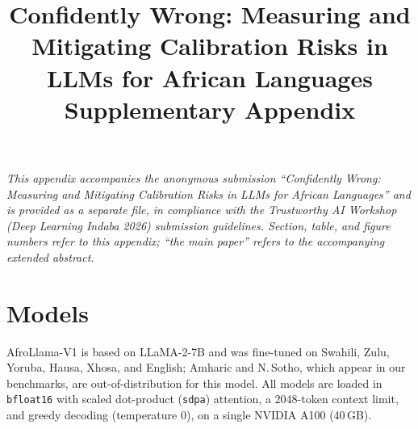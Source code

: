 \documentclass[pmlr]{jmlr}%
\title[Confidently Wrong: Appendix]{Confidently Wrong: Measuring and Mitigating Calibration Risks in LLMs for African Languages \\[2pt] \large Supplementary Appendix}
\author{\Name{Anonymous Author(s)}}
\begin{document}
\maketitle
\thispagestyle{jmlrtps}%
\pagestyle{plain}%
\vspace{-2.2em}

\noindent\textit{This appendix accompanies the anonymous submission ``Confidently Wrong: Measuring
and Mitigating Calibration Risks in LLMs for African Languages'' and is provided as a separate file,
in compliance with the Trustworthy AI Workshop (Deep Learning Indaba 2026) submission guidelines.
Section, table, and figure numbers refer to this appendix; ``the main paper'' refers to the
accompanying extended abstract.}

\appendix

\section{Models}\label{app:models}
\begin{table}[H]\centering\small
\caption{Open-weight models evaluated.}
\label{tab:models}
\end{table}

AfroLlama-V1 is based on LLaMA-2-7B and was fine-tuned on Swahili, Zulu, Yoruba, Hausa, Xhosa, and
English; Amharic and N.\,Sotho, which appear in our benchmarks, are out-of-distribution for this
model. All models are loaded in \texttt{bfloat16} with scaled dot-product (\texttt{sdpa}) attention,
a 2048-token context limit, and greedy decoding (temperature 0), on a single NVIDIA A100 (40\,GB).
\end{document}
